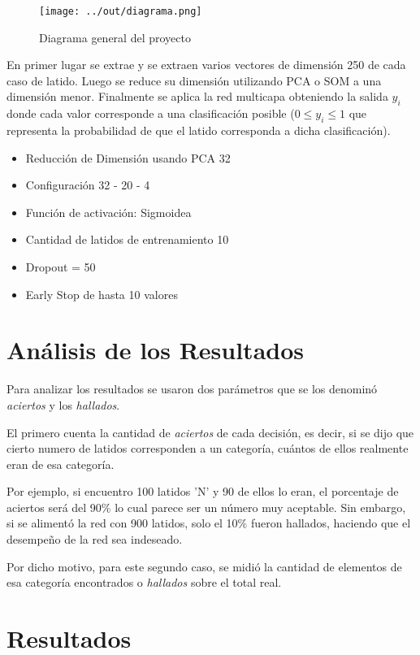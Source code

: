 \documentclass[conference]{IEEEtran}
\theoremstyle{definition}
\begin{document}
\begin{figure}[H]
	\centering
	\texttt{[image: ../out/diagrama.png]}
	\caption{Diagrama general del proyecto}
	\label{fig_diagram}
\end{figure}

En primer lugar se extrae y se extraen varios vectores de dimensión 250 de cada caso de latido. 
Luego se reduce su dimensión utilizando PCA o SOM a una dimensión menor.
Finalmente se aplica la red multicapa obteniendo la salida \(y_i\) donde cada valor corresponde a una clasificación posible (\(0 \le y_i \le 1\) que representa la probabilidad de que el latido corresponda a dicha clasificación). 

\begin{itemize}
	\item Reducción de Dimensión usando PCA 32
	\item Configuración 32 - 20 - 4
	\item Función de activación: Sigmoidea 
	\item Cantidad de latidos de entrenamiento 10
	\item Dropout = 50%
	\item Early Stop de hasta 10 valores
\end{itemize}

\section{Análisis de los Resultados}

Para analizar los resultados se usaron dos parámetros que se los denominó \textit{aciertos} y los \textit{hallados}. 

El primero cuenta la cantidad de \textit{aciertos} de cada decisión, es decir, si se dijo que cierto numero de latidos corresponden a un categoría, cuántos de ellos realmente eran de esa categoría.

Por ejemplo, si encuentro 100 latidos 'N' y 90 de ellos lo eran, el porcentaje de aciertos será del 90\% lo cual parece ser un número muy aceptable. Sin embargo, si se alimentó la red con 900 latidos, solo el 10\% fueron hallados, haciendo que el desempeño de la red sea indeseado.

Por dicho motivo, para este segundo caso, se midió la cantidad de elementos de esa categoría encontrados o \textit{hallados} sobre el total real.

\section{Resultados}
\end{document}
